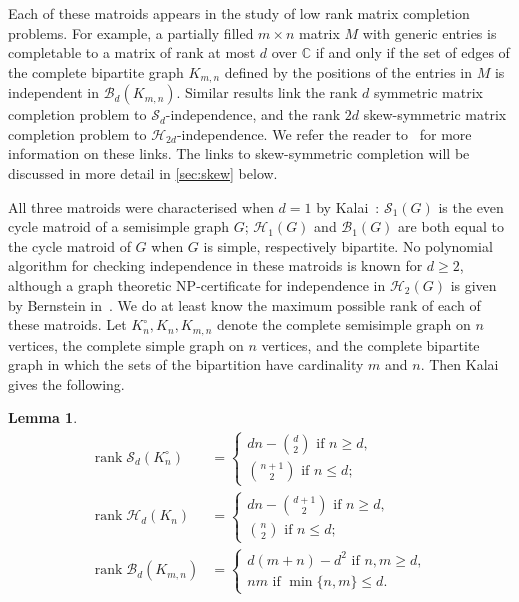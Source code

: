 \documentclass[11pt,a4paper,dvipsnames]{scrartcl}
\newtheorem{lemma}[theorem]{Lemma}
\newcommand{\complex}{{\mathbb{C}}}
\newcommand{\cB}{{\mathcal{B}}}
\newcommand{\cS}{{\mathcal{S}}}
\newcommand{\cH}{{\mathcal{H}}}
\DeclareMathOperator{\rank}{rank}
\begin{document}
Each of these matroids appears in the study of low rank matrix completion problems. For example, a partially  filled $m\times n$  matrix $M$ with generic entries is completable to a matrix of rank at most $d$ over $\complex$ if and only if the set of edges of the complete bipartite graph $K_{m,n}$ defined by the positions of the entries in $M$ is independent in $\cB_d(K_{m,n})$. Similar results link the rank $d$ symmetric matrix completion problem to $\cS_d$-independence, and the rank $2d$ skew-symmetric matrix completion problem 
to $\cH_{2d}$-independence.  
We refer the reader to~\cite{B,JJT, JJT2, RS, SC} for more information on these links. The links to skew-symmetric completion will be discussed in more detail in \cref{sec:skew} below.

All three matroids were characterised when $d=1$ by Kalai~\cite{K}: $\cS_1(G)$ is the even cycle matroid of a semisimple graph $G$;  $\cH_1(G)$ and $\cB_1(G)$ are both equal to the cycle matroid of $G$ when $G$ is simple, respectively bipartite. No polynomial algorithm for checking independence in these matroids is known for $d\geq 2$, although a graph theoretic NP-certificate for independence in $\cH_2(G)$  is given by Bernstein in~\cite{B}. 
We do at least know the maximum possible rank of each of these matroids. Let $K_n^\circ, K_n, K_{m,n}$ denote the complete semisimple graph on $n$ vertices, the complete simple graph on $n$ vertices, and the complete bipartite graph in which the sets of the bipartition have cardinality $m$ and $n$. Then Kalai~\cite{K} gives the following.
\begin{lemma}\label{lem:kalai}
\begin{align*}
    \rank \cS_d(K_n^\circ)&=\begin{cases}
        dn-\binom{d}{2} \mbox{ if $n\geq d$},\\  
        \binom{n+1}{2}  \mbox{ if $n\leq d$};
    \end{cases}\\
    \rank \cH_d(K_n)&=\begin{cases}
        dn-\binom{d+1}{2} \mbox{ if $n\geq d$},\\  
        \binom{n}{2}  \mbox{ if $n\leq d$};
    \end{cases}\\
    \rank \cB_d(K_{m,n})&=\begin{cases}
        d(m+n)-d^2 \mbox{ if $n,m\geq d$},\\  
        nm \mbox{  if $\min\{n,m\}\leq d$}.
    \end{cases}
\end{align*}
\end{lemma}
\end{document}
